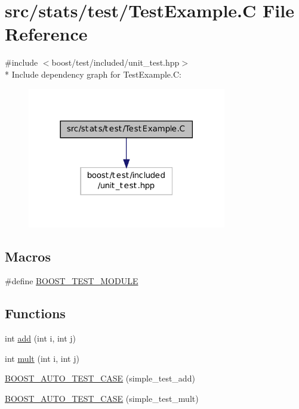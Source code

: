 \hypertarget{_test_example_8_c}{\section{src/stats/test/\-Test\-Example.C File Reference}
\label{_test_example_8_c}
}
{\ttfamily \#include $<$boost/test/included/unit\-\_\-test.\-hpp$>$}\\*
Include dependency graph for Test\-Example.\-C\-:
\nopagebreak
\begin{figure}[H]
\begin{center}
\leavevmode
\includegraphics[width=246pt]{_test_example_8_c__incl}
\end{center}
\end{figure}
\subsection*{Macros}
\begin{DoxyCompactItemize}
\item 
\#define \hyperlink{_test_example_8_c_a6b2a3852db8bb19ab6909bac01859985}{B\-O\-O\-S\-T\-\_\-\-T\-E\-S\-T\-\_\-\-M\-O\-D\-U\-L\-E}
\end{DoxyCompactItemize}
\subsection*{Functions}
\begin{DoxyCompactItemize}
\item 
int \hyperlink{_test_example_8_c_aa7f079e0b82ccae0e49bc7273b696d4e}{add} (int i, int j)
\item 
int \hyperlink{_test_example_8_c_a6c4b5fa13733b2b0d45a4abc245e3f04}{mult} (int i, int j)
\item 
\hyperlink{_test_example_8_c_a6c6f2bb6a69edfed6d04e1c2729c78b9}{B\-O\-O\-S\-T\-\_\-\-A\-U\-T\-O\-\_\-\-T\-E\-S\-T\-\_\-\-C\-A\-S\-E} (simple\-\_\-test\-\_\-add)
\item 
\hyperlink{_test_example_8_c_aa77f830c2f5a4c491ff5829cb91cab61}{B\-O\-O\-S\-T\-\_\-\-A\-U\-T\-O\-\_\-\-T\-E\-S\-T\-\_\-\-C\-A\-S\-E} (simple\-\_\-test\-\_\-mult)
\end{DoxyCompactItemize}



